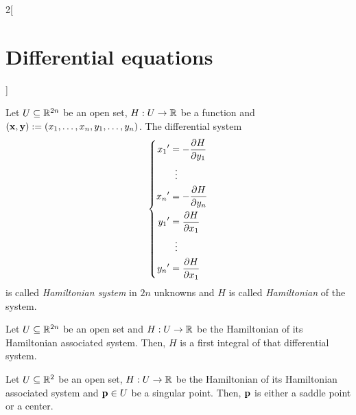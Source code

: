 \documentclass[../../../main.tex]{subfiles}
\begin{document}
\begin{multicols}{2}[\section{Differential equations}]
\begin{proposition}
  \end{proposition}
  \begin{definition}
    Let $U\subseteq \mathbb{R}^{2n}$ be an open set, $H:U\rightarrow\mathbb{R}$ be a function and $(\boldsymbol{\mathrm{x}},\boldsymbol{\mathrm{y}}):=(x_1,\ldots,x_n,y_1,\ldots,y_n)$. The differential system
    \begin{equation*}
      \left\{
      \begin{aligned}
        {x_1}' & =-\pdv{H}{y_1}(\boldsymbol{\mathrm{x}}) \\
               & \;\;\vdots             \\
        {x_n}' & =-\pdv{H}{y_n}(\boldsymbol{\mathrm{x}}) \\
        {y_1}' & =\pdv{H}{x_1}(\boldsymbol{\mathrm{x}})  \\
               & \;\;\vdots             \\
        {y_n}' & =\pdv{H}{x_1}(\boldsymbol{\mathrm{x}})  \\
      \end{aligned}
      \right.
    \end{equation*}
    is called \emph{Hamiltonian system} in $2n$ unknowns and $H$ is called \emph{Hamiltonian} of the system.
  \end{definition}
  \begin{proposition}
    Let $U\subseteq \mathbb{R}^{2n}$ be an open set and $H:U\rightarrow\mathbb{R}$ be the Hamiltonian of its Hamiltonian associated system. Then, $H$ is a first integral of that differential system.
  \end{proposition}
  \begin{theorem}
    Let $U\subseteq \mathbb{R}^{2}$ be an open set, $H:U\rightarrow\mathbb{R}$ be the Hamiltonian of its Hamiltonian associated system and $\boldsymbol{\mathrm{p}}\in U$ be a singular point. Then, $\boldsymbol{\mathrm{p}}$ is either a saddle point or a center.
  \end{theorem}

\end{multicols}
\end{document}

